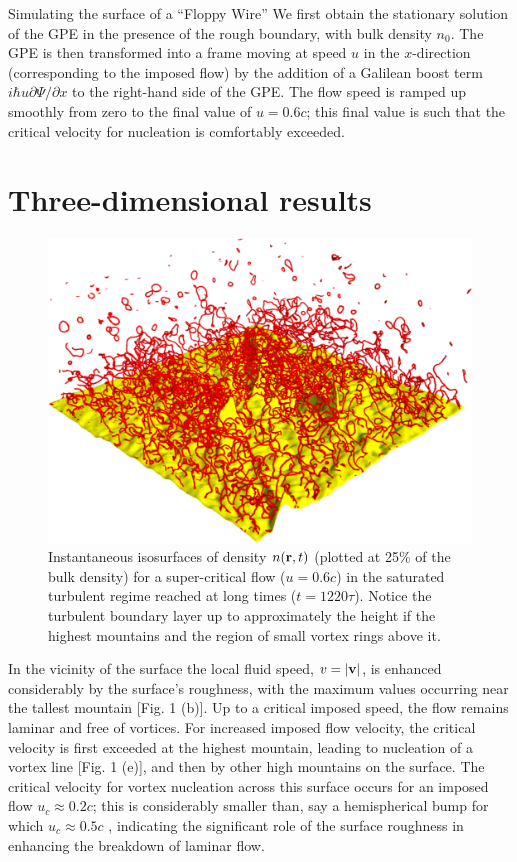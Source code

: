 \begin{chapter}{\label{cha:afm}Simulating the surface of a ``Floppy Wire''}
We first obtain the stationary solution of the GPE in the presence of
the rough boundary, with bulk density $n_0$.  The GPE is then transformed into a frame moving at speed $u$ in the $x$-direction (corresponding to the imposed flow) by the addition of a Galilean boost term $ i \hbar u \partial \Psi/\partial x$ to the right-hand side of the GPE.  The flow speed {is}
ramped up smoothly from zero to the final value of $u=0.6 c$; this final value is such that the critical velocity for nucleation is comfortably exceeded. 

\section{Three-dimensional results}
\begin{figure}
\centering
{}%
\includegraphics[width=0.5\linewidth]{./afm/fig2-2b}%
\caption{Instantaneous isosurfaces of density $n({\bf r},t)$ 
(plotted at 25\%  of the bulk density) for a super-critical flow ($u=0.6 c$) in the saturated 
turbulent regime reached at long times ($t=1220 \tau$).  Notice the turbulent boundary layer up to
approximately the height if the highest mountains and the region
of small vortex rings above it.}
\label{fig2}
\end{figure}  
{In the vicinity of the surface the local fluid speed}, $v=|{\bf v}|$, 
is enhanced considerably by the {surface's} roughness, 
with the maximum values occurring near the tallest mountain [Fig. 1 (b)].   Up to a critical imposed speed, the flow remains laminar and free of vortices.  For increased imposed flow velocity, the critical velocity is first exceeded at the highest mountain, leading to nucleation of a vortex line [Fig. 1 (e)], and then by other high mountains on the surface.  The critical velocity for vortex nucleation across this surface occurs for an imposed flow $u_c\approx 0.2 c$; this is considerably smaller than, say a hemispherical bump for which $u_c \approx 0.5 c$ \cite{winiecki},  indicating the significant role of the surface roughness in enhancing the breakdown of laminar flow.  


\end{chapter}
